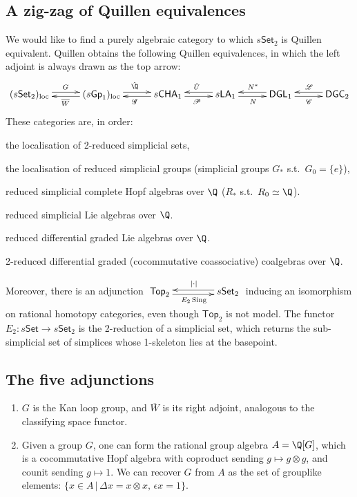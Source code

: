 \documentclass[11pt]{article}
\begin{document}
\begin{JeremyRationalHomotopyPractice}
\subsection*{A zig-zag of Quillen equivalences}
We would like to find a purely algebraic category to which $s\mathsf{Set}_2$ is Quillen equivalent. Quillen obtains the following Quillen equivalences, in which the left adjoint is always drawn as the top arrow:
\[\xymatrix@R=.3cm@C=1cm{
(s\mathsf{Set}_2)_\textup{loc}  \ar@<.6ex>[r]^{G}
&(s\mathsf{Gp}_1)_\textup{loc}  \ar@<.4ex>[l]^{\overline{W}}\ar@<.6ex>[r]^{\hat\Q}
&s\mathsf{CHA}_1  \ar@<.4ex>[l]^{\scrG}\ar@<-.4ex>[r]_{\scrP}
&s\mathsf{LA}_1  \ar@<-.6ex>[l]_{\hat U}\ar@<-.4ex>[r]_{N}
&\mathsf{DGL}_1  \ar@<-.6ex>[l]_{N^*}\ar@<-.4ex>[r]_{\scrC}
&\mathsf{DGC}_2  \ar@<-.6ex>[l]_{\scrL}
}\]
These categories are, in order:
\begin{itemise}
\item the localisation of 2-reduced simplicial sets, 
\item the localisation of reduced simplicial groups (simplicial groups $G_*$ s.t.\ $G_0=\{e\}$),
\item reduced simplicial complete Hopf algebras over $\Q$ ($R_*$ s.t.\ $R_0\simeq\Q$).
\item reduced simplicial Lie algebras over $\Q$.
\item reduced differential graded Lie algebras over $\Q$.
\item 2-reduced differential graded (cocommutative coassociative) coalgebras over $\Q$.
\end{itemise}
Moreover, there is an adjunction {$\xymatrix@R=.3cm@C=1.5cm{
\mathsf{Top}_2  \ar@<-.4ex>[r];[]_{|\cdot|}&
s\mathsf{Set}_2  \ar@<-.6ex>[l];[]_{E_2\Sing}
}
$} inducing an isomorphism on rational homotopy categories, even though $\mathsf{Top}_2$ is not model. The functor $E_2:s\mathsf{Set}\to s\mathsf{Set}_2$ is the 2-reduction of a simplicial set, which returns the sub-simplicial set of simplices whose 1-skeleton lies at the basepoint.
\subsection*{The five adjunctions}
\begin{enumerate}\squishlist
\item $G$ is the Kan loop group, and $\overline{W}$ is its right adjoint, analogous to the classifying space functor.
\item Given a group $G$, one can form the rational group algebra $A=\Q[G]$, which is a cocommutative Hopf algebra with coproduct sending $g\mapsto g\otimes g$, and counit sending $g\mapsto1$. We can recover $G$ from $A$ as the set of grouplike elements: $\{x\in A\,|\,\Delta x=x\otimes x,\,\epsilon x=1\}$.


\end{enumerate}
\end{JeremyRationalHomotopyPractice}
\end{document}
